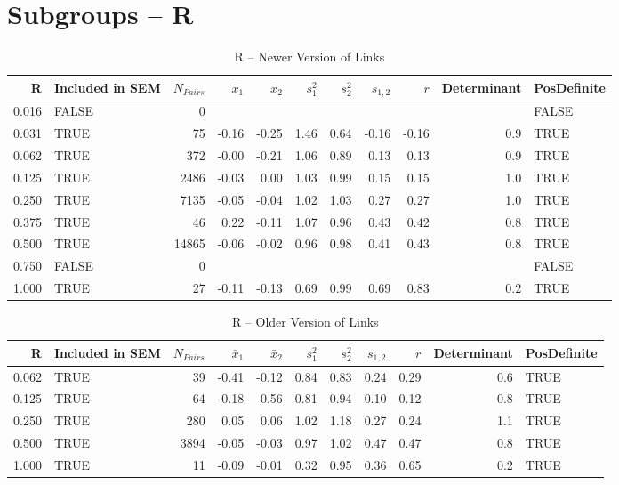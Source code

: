 \documentclass{article}\usepackage[]{graphicx}\usepackage[]{color}
\begin{document}
\section{Subgroups --  R }%
\begin{table}[ht]
\centering
\begin{tabular}{rlrrrrrrrrl}
  \hline
R & Included in SEM & $N_{Pairs}$ & $\bar{x}_1$ & $\bar{x}_2$ & $s_1^2$ & $s_2^2$ & $s_{1,2}$ & $r$ & Determinant & PosDefinite \\ 
  \hline
0.016 & FALSE & 0 &  &  &  &  &  &  &  & FALSE \\ 
  0.031 & TRUE & 75 & -0.16 & -0.25 & 1.46 & 0.64 & -0.16 & -0.16 & 0.9 & TRUE \\ 
  0.062 & TRUE & 372 & -0.00 & -0.21 & 1.06 & 0.89 & 0.13 & 0.13 & 0.9 & TRUE \\ 
  0.125 & TRUE & 2486 & -0.03 & 0.00 & 1.03 & 0.99 & 0.15 & 0.15 & 1.0 & TRUE \\ 
  0.250 & TRUE & 7135 & -0.05 & -0.04 & 1.02 & 1.03 & 0.27 & 0.27 & 1.0 & TRUE \\ 
  0.375 & TRUE & 46 & 0.22 & -0.11 & 1.07 & 0.96 & 0.43 & 0.42 & 0.8 & TRUE \\ 
  0.500 & TRUE & 14865 & -0.06 & -0.02 & 0.96 & 0.98 & 0.41 & 0.43 & 0.8 & TRUE \\ 
  0.750 & FALSE & 0 &  &  &  &  &  &  &  & FALSE \\ 
  1.000 & TRUE & 27 & -0.11 & -0.13 & 0.69 & 0.99 & 0.69 & 0.83 & 0.2 & TRUE \\ 
   \hline
\end{tabular}
\caption{R -- Newer Version of Links} 
\end{table}
\begin{table}[ht]
\centering
\begin{tabular}{rlrrrrrrrrl}
  \hline
R & Included in SEM & $N_{Pairs}$ & $\bar{x}_1$ & $\bar{x}_2$ & $s_1^2$ & $s_2^2$ & $s_{1,2}$ & $r$ & Determinant & PosDefinite \\ 
  \hline
0.062 & TRUE & 39 & -0.41 & -0.12 & 0.84 & 0.83 & 0.24 & 0.29 & 0.6 & TRUE \\ 
  0.125 & TRUE & 64 & -0.18 & -0.56 & 0.81 & 0.94 & 0.10 & 0.12 & 0.8 & TRUE \\ 
  0.250 & TRUE & 280 & 0.05 & 0.06 & 1.02 & 1.18 & 0.27 & 0.24 & 1.1 & TRUE \\ 
  0.500 & TRUE & 3894 & -0.05 & -0.03 & 0.97 & 1.02 & 0.47 & 0.47 & 0.8 & TRUE \\ 
  1.000 & TRUE & 11 & -0.09 & -0.01 & 0.32 & 0.95 & 0.36 & 0.65 & 0.2 & TRUE \\ 
   \hline
\end{tabular}
\caption{R -- Older Version of Links} 
\end{table}
\newpage 
\end{document}
